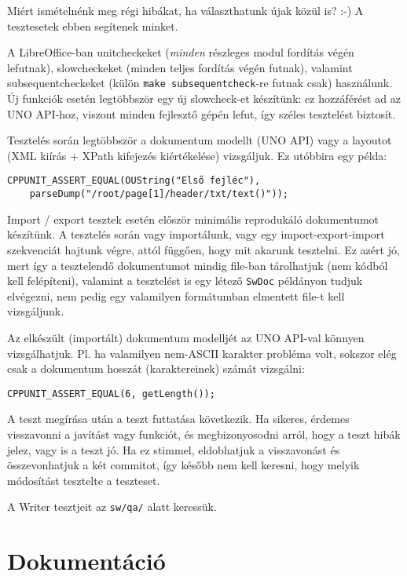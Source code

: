 \documentclass[a4paper]{report}
\begin{document}
Miért ismételnénk meg régi hibákat, ha választhatunk újak közül is? :-) A tesztesetek ebben segítenek minket.

A LibreOffice-ban unitcheckeket (\emph{minden} részleges modul fordítás végén
lefutnak), slowcheckeket (minden teljes fordítás végén futnak), valamint
subsequentcheckeket (külön \texttt{make subsequentcheck}-re futnak csak)
használunk. Új funkciók esetén legtöbbször egy új slowcheck-et készítünk: ez
hozzáférést ad az UNO API-hoz, viszont minden fejlesztő gépén lefut, így széles
tesztelést biztosít.

Tesztelés során legtöbbször a dokumentum modellt (UNO API) vagy a layoutot (XML
kiírás + XPath kifejezés kiértékelése) vizsgáljuk. Ez utóbbira egy példa:

\begin{verbatim}
CPPUNIT_ASSERT_EQUAL(OUString("Első fejléc"),
    parseDump("/root/page[1]/header/txt/text()"));
\end{verbatim}

Import / export tesztek esetén először minimális reprodukáló dokumentumot
készítünk. A tesztelés során vagy importálunk, vagy egy import-export-import
szekvenciát hajtunk végre, attól függően, hogy mit akarunk tesztelni. Ez azért
jó, mert így a tesztelendő dokumentumot mindig file-ban tárolhatjuk (nem kódból
kell felépíteni), valamint a tesztelést is egy létező \texttt{SwDoc} példányon
tudjuk elvégezni, nem pedig egy valamilyen formátumban elmentett file-t kell
vizsgáljunk.

Az elkészült (importált) dokumentum modelljét az UNO API-val könnyen
vizsgálhatjuk. Pl. ha valamilyen nem-ASCII karakter probléma volt, sokszor elég
csak a dokumentum hosszát (karaktereinek) számát vizsgálni:

\begin{verbatim}
CPPUNIT_ASSERT_EQUAL(6, getLength());
\end{verbatim}

A teszt megírása után a teszt futtatása következik. Ha sikeres, érdemes
visszavonni a javítást vagy funkciót, és megbizonyosodni arról, hogy a teszt
hibák jelez, vagy is a teszt jó. Ha ez stimmel, eldobhatjuk a visszavonást és
összevonhatjuk a két commitot, így később nem kell keresni, hogy melyik
módosítást tesztelte a teszteset.

A Writer tesztjeit az \texttt{sw/qa/} alatt keressük.

\section{Dokumentáció}
\end{document}
